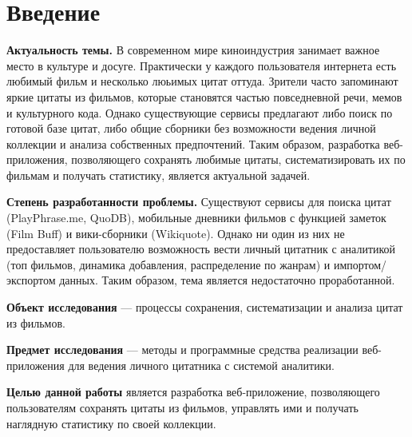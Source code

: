 \section*{Введение}

\textbf{Актуальность темы.} В современном мире киноиндустрия занимает важное место в культуре и досуге. Практически 
у каждого пользователя интернета есть любимый фильм и несколько люьимых цитат оттуда. Зрители часто запоминают яркие 
цитаты из фильмов, которые становятся частью повседневной речи, мемов и культурного кода. Однако существующие сервисы 
предлагают либо поиск по готовой базе цитат, либо общие сборники без возможности ведения личной коллекции и анализа 
собственных предпочтений. Таким образом, разработка веб-приложения, позволяющего сохранять любимые цитаты, 
систематизировать их по фильмам и получать статистику, является актуальной задачей. 

\textbf{Степень разработанности проблемы.} Существуют сервисы для поиска цитат (PlayPhrase.me, QuoDB), мобильные 
дневники фильмов с функцией заметок (Film Buff) и вики-сборники (Wikiquote). Однако ни один из них не предоставляет 
пользователю возможность вести личный цитатник с аналитикой (топ фильмов, динамика добавления, распределение по жанрам) 
и импортом/экспортом данных. Таким образом, тема является недостаточно проработанной.


\textbf{Объект исследования} — процессы сохранения, систематизации и анализа цитат из фильмов.

\textbf{Предмет исследования} — методы и программные средства реализации веб-приложения для ведения личного цитатника с системой аналитики.

\textbf{Целью данной работы} является разработка веб-приложение, позволяющего пользователям сохранять 
цитаты из фильмов, управлять ими и получать наглядную статистику по своей коллекции.

